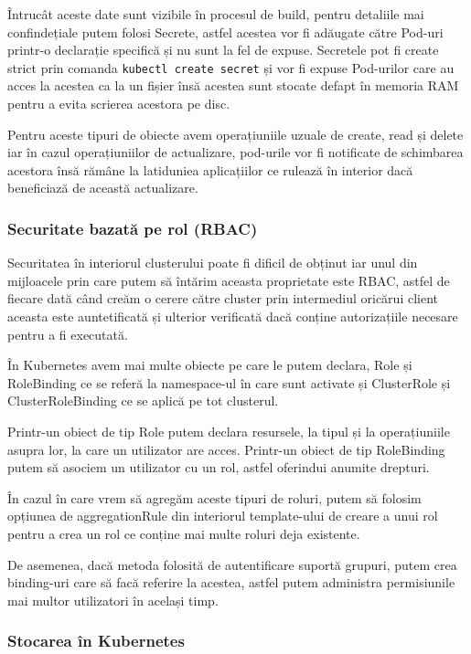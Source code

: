 Întrucât aceste date sunt vizibile în procesul de build, pentru detaliile 
mai confindețiale putem folosi Secrete, astfel acestea vor fi adăugate către Pod-uri 
printr-o declarație specifică și nu sunt la fel de expuse. Secretele pot fi create
strict prin comanda \verb|kubectl create secret| și vor fi expuse Pod-urilor care 
au acces la acestea ca la un fișier însă acestea sunt stocate defapt în memoria RAM 
pentru a evita scrierea acestora pe disc.

Pentru aceste tipuri de obiecte avem operațiuniile uzuale de create, read și delete
iar în cazul operațiuniilor de actualizare, pod-urile vor fi notificate de schimbarea
acestora însă rămâne la latiduniea aplicațiilor ce rulează în interior dacă beneficiază
de această actualizare.

\subsubsection{Securitate bazată pe rol (RBAC)}

Securitatea în interiorul clusterului poate fi dificil de obținut iar unul 
din mijloacele prin care putem să întărim aceasta proprietate este RBAC, astfel
de fiecare dată când creăm o cerere către cluster prin intermediul oricărui client
aceasta este auntetificată și ulterior verificată dacă conține autorizațiile necesare
pentru a fi executată.

În Kubernetes avem mai multe obiecte pe care le putem declara, Role și RoleBinding 
ce se referă la namespace-ul în care sunt activate și ClusterRole și ClusterRoleBinding
ce se aplică pe tot clusterul.

Printr-un obiect de tip Role putem declara resursele, la tipul și la operațiuniile asupra lor, 
la care un utilizator are acces. Printr-un obiect de tip RoleBinding putem să asociem 
un utilizator cu un rol, astfel oferindui anumite drepturi.

În cazul în care vrem să agregăm aceste tipuri de roluri, putem să folosim
opțiunea de aggregationRule din interiorul template-ului de creare a unui rol
pentru a crea un rol ce conține mai multe roluri deja existente.

De asemenea, dacă metoda folosită de autentificare suportă grupuri, putem crea
binding-uri care să facă referire la acestea, astfel putem administra permisiunile
mai multor utilizatori în același timp.

\subsubsection{Stocarea în Kubernetes}

